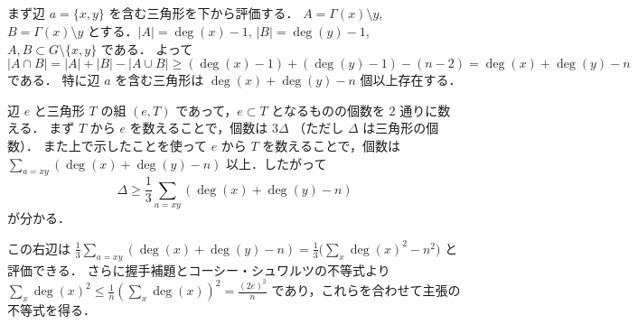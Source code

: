 \subsection{}
まず辺 $a=\{x,y\}$ を含む三角形を下から評価する．
$A = \Gamma(x)\setminus y$, $B=\Gamma(x)\setminus y$ とする．$|A| = \deg(x) - 1$, $|B| = \deg(y) - 1$, $A,B\subset G\setminus\{x,y\}$ である．
よって $|A\cap B| = |A| + |B| - |A\cup B| \geq (\deg(x)-1) + (\deg(y)-1) - (n-2) = \deg(x) + \deg(y) - n$ である．
特に辺 $a$ を含む三角形は $\deg(x) + \deg(y) - n$ 個以上存在する．

辺 $e$ と三角形 $T$ の組 $(e,T)$ であって，$e\subset T$ となるものの個数を $2$ 通りに数える．
まず $T$ から $e$ を数えることで，個数は $3\Delta$ （ただし $\Delta$ は三角形の個数）．
また上で示したことを使って $e$ から $T$ を数えることで，個数は
$\sum_{a=xy}(\deg(x)+\deg(y)-n)$ 以上．したがって
\[
 \Delta\geq \frac13\sum_{a=xy}(\deg(x)+\deg(y)-n)
\]
が分かる．

この右辺は $\frac13\sum_{a=xy}(\deg(x)+\deg(y)-n)=\frac13\bigl(\sum_x \deg(x)^2 - n^2)$ と評価できる．
さらに握手補題とコーシー・シュワルツの不等式より
$\sum_x \deg(x)^2 \leq \frac1n (\sum_x\deg(x))^2 = \frac{(2e)^2}{n}$ であり，これらを合わせて主張の不等式を得る．
